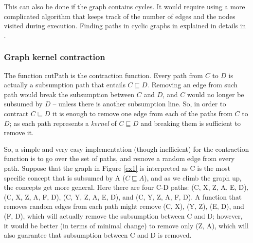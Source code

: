 This can also be done if the graph contains cycles. It would require using a more complicated algorithm that keeps track of the number of edges and the nodes visited during execution. Finding paths in cyclic graphs in explained in details in \cite{alg}.

\subsubsection{Graph kernel contraction}
The function cutPath is the contraction function. Every path from $C$ to $D$ is actually a subsumption path that entails $C \sqsubseteq D$. Removing an edge from such path would break the subsumption between $C$ and $D$, and $C$ would no longer be subsumed by $D$ -- unless there is another subsumption line. So, in order to contract $C \sqsubseteq D$ it is enough to remove one edge from each of the paths from $C$ to $D$; as each path represents a \textit{kernel} of $C \sqsubseteq D$ and breaking them is sufficient to remove it. 

So, a simple and very easy implementation (though inefficient) for the contraction function is to go over the set of paths, and remove a random edge from every path. Suppose that the graph in Figure \ref{ex1} is interpreted as C is the most specific concept that is subsumed by A ($C \sqsubseteq A$), and as we climb the graph up, the concepts get more general. Here there are four C-D paths: (C, X, Z, A, E, D), (C, X, Z, A, F, D), (C, Y, Z, A, E, D), and (C, Y, Z, A, F, D). A function that removes random edges from each path might remove (C, X), (Y, Z), (E, D), and (F, D), which will actually remove the subsumption between C and D; however, it would be better (in terms of minimal change) to remove only (Z, A), which will also guarantee that subsumption between C and D is removed.


